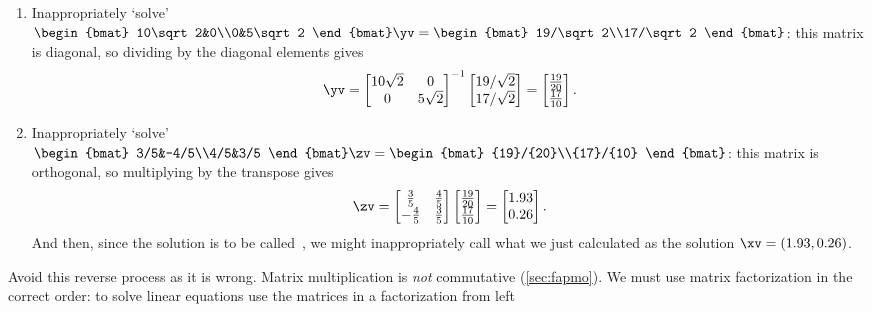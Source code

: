 \begin{example}
\begin{enumerate}
\item Inappropriately `solve' \(\begin{bmat} 10\sqrt2&0\\0&5\sqrt2 \end{bmat}\yv=\begin{bmat} 19/\sqrt2\\17/\sqrt2 \end{bmat}\):  this matrix is diagonal, so dividing by the diagonal elements gives 
\begin{equation*}
\yv=\begin{bmatrix} 10\sqrt2&0\\0&5\sqrt2 \end{bmatrix}^{-1}
\begin{bmatrix} 19/\sqrt2\\17/\sqrt2 \end{bmatrix}
=\begin{bmatrix} \frac{19}{20}\\\frac{17}{10} \end{bmatrix}.
\end{equation*}

\item Inappropriately `solve' \(\begin{bmat} 3/5&-4/5\\4/5&3/5 \end{bmat}\zv=\begin{bmat} {19}/{20}\\{17}/{10} \end{bmat}\): this matrix is orthogonal, so multiplying by the transpose gives 
\begin{equation*}
\zv=\begin{bmatrix} \frac35&\frac45\\-\frac45&\frac35 \end{bmatrix}
\begin{bmatrix} \frac{19}{20}\\\frac{17}{10} \end{bmatrix}
=\begin{bmatrix} 1.93\\0.26 \end{bmatrix}.
\end{equation*}
And then, since the solution is to be called~\xv, we might inappropriately call what we just calculated as the solution \(\xv=(1.93,0.26)\). 
\aqed
\end{enumerate}
\end{example}
Avoid this reverse process as it is wrong.
Matrix multiplication is \emph{not} commutative (\cref{sec:fapmo}).  
We must use matrix factorization in the correct order: to solve linear equations use the matrices in a factorization from left 





